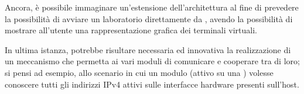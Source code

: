 Ancora, è possibile immaginare un'estensione dell'architettura al fine di prevedere la possibilità di avviare un laboratorio direttamente da \visualnetkit{}, avendo la possibilità di mostrare all'utente una rappresentazione grafica dei terminali virtuali.

In ultima istanza, potrebbe risultare necessaria ed innovativa la realizzazione di un meccanismo che permetta ai vari moduli di comunicare e cooperare tra di loro; si pensi ad esempio, allo scenario in cui un modulo (attivo su una \virtualmachine) volesse conoscere tutti gli indirizzi IPv4 attivi sulle interfacce hardware presenti sull'host.
